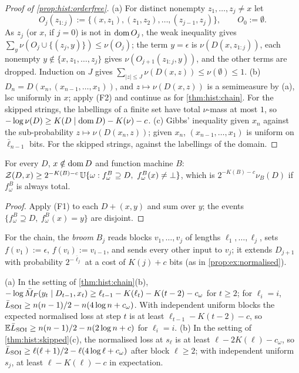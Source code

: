 \begin{proof}[Proof of \cref{prop:hist:orderfree}]
(a) For distinct nonempty $z_1,\dots,z_j\ne x$ let
\[O_j(z_{1:j}):=\{(x,z_1),(z_1,z_2),\dots,(z_{j-1},z_j)\},\qquad O_0:=\emptyset.\]
As $z_j$ (or $x$, if $j=0$) is not in $\operatorname{dom} O_j$, the weak inequality gives $\sum_y\nu(O_j\cup\{(z_j,y)\})\le\nu(O_j)$; the term $y=\epsilon$ is $\nu(D(x,z_{1:j}))$, each nonempty $y\notin\{x,z_1,\dots,z_j\}$ gives $\nu(O_{j+1}(z_{1:j},y))$, and the other terms are dropped. Induction on $J$ gives $\sum_{|z|\le J}\nu(D(x,z))\le\nu(\emptyset)\le1$.
(b) $D_n=D(x_n,(x_{n-1},\dots,x_1))$, and $z\mapsto\nu(D(x,z))$ is a semimeasure by (a), lsc uniformly in $x$; apply (F2) and continue as for \cref{thm:hist:chain}. For the skipped strings, the labellings of a finite set have total $\nu$-mass at most $1$, so $-\log\nu(D)\ge K(D\mid\operatorname{dom} D)-K(\nu)-c$.
(c) Gibbs' inequality given $x_n$ against the sub-probability $z\mapsto\nu(D(x_n,z))$; given $x_n$, $(x_{n-1},\dots,x_1)$ is uniform on $\bar\ell_{n-1}$ bits. For the skipped strings, against the labellings of the domain.
\end{proof}

\begin{lemma}\label{lem:hist:broom}
For every $D$, $x\notin\operatorname{dom} D$ and function machine $B$: $\mathcal{Z}(D,x)\ge2^{-K(B)-c}\,\mathbb{U}\{\omega:f^B_\omega\supseteq D,\ f^B_\omega(x)\ne\bot\}$, which is $2^{-K(B)-c}\nu_B(D)$ if $f^B_\omega$ is always total.
\end{lemma}

\begin{proof}
Apply (F1) to each $D+(x,y)$ and sum over $y$; the events $\{f^B_\omega\supseteq D,\ f^B_\omega(x)=y\}$ are disjoint.
\end{proof}

For the chain, the \emph{broom} $B_j$ reads blocks $v_1,\dots,v_j$ of lengths $\ell_1,\dots,\ell_j$, sets $f(v_1):=\epsilon$, $f(v_i):=v_{i-1}$, and sends every other input to $v_j$; it extends $D_{j+1}$ with probability $2^{-\bar\ell_j}$ at a cost of $K(j)+c$ bits (as in \cref{prop:ex:normalised}).

\begin{proposition}\label{prop:hist:normchain}
(a) In the setting of \cref{thm:hist:chain}(b), $-\log\bar{M}_{F}(y_t\mid D_{t-1},x_t)\ge\ell_{t-1}-K(\ell_t)-K(t-2)-c_\omega$ for $t\ge2$; for $\ell_i=i$, $\bar{L}_{\mathrm{SOI}}\ge n(n-1)/2-n(4\log n+c_\omega)$. With independent uniform blocks the expected normalised loss at step $t$ is at least $\ell_{t-1}-K(t-2)-c$, so $\mathbb{E}\bar{L}_{\mathrm{SOI}}\ge n(n-1)/2-n(2\log n+c)$ for $\ell_i=i$.
(b) In the setting of \cref{thm:hist:skipped}(c), the normalised loss at $s_\ell$ is at least $\ell-2K(\ell)-c_\omega$, so $\bar{L}_{\mathrm{SOI}}\ge\ell(\ell+1)/2-\ell(4\log\ell+c_\omega)$ after block $\ell\ge2$; with independent uniform $s_j$, at least $\ell-K(\ell)-c$ in expectation.
\end{proposition}

